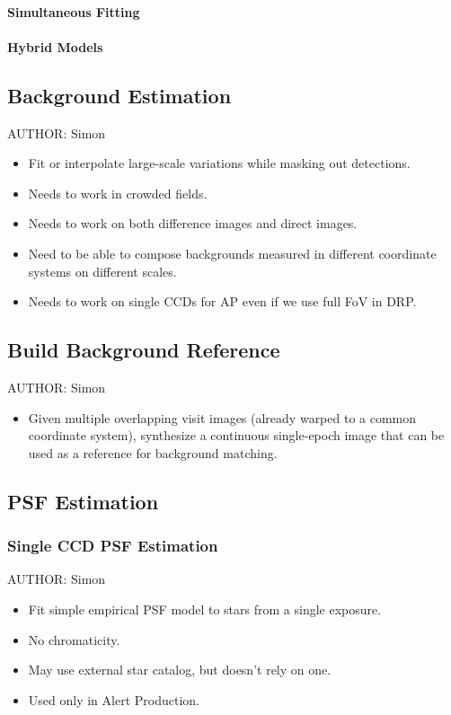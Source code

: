 \paragraph{Simultaneous Fitting}
\label{sec:acSimultaneousFitting}
\paragraph{Hybrid Models}
\label{sec:acHybridModels}

\subsection{Background Estimation}
\label{sec:acBackgroundEstimation}
AUTHOR: Simon
\begin{itemize}
\item Fit or interpolate large-scale variations while masking out detections.
\item Needs to work in crowded fields.
\item Needs to work on both difference images and direct images.
\item Need to be able to compose backgrounds measured in different coordinate systems on different scales.
\item Needs to work on single CCDs for AP even if we use full FoV in DRP.
\end{itemize}

\subsection{Build Background Reference}
\label{sec:acBuildBackgroundReference}
AUTHOR: Simon
\begin{itemize}
\item Given multiple overlapping visit images (already warped to a common coordinate system), synthesize a continuous single-epoch image that can be used as a reference for background matching.
\end{itemize}

\subsection{PSF Estimation}
\label{sec:acPSFEstimation}

\subsubsection{Single CCD PSF Estimation}
\label{sec:acSingleCCDPSF}
AUTHOR: Simon
\begin{itemize}
\item Fit simple empirical PSF model to stars from a single exposure.
\item No chromaticity.
\item May use external star catalog, but doesn't rely on one.
\item Used only in Alert Production.
\end{itemize}

